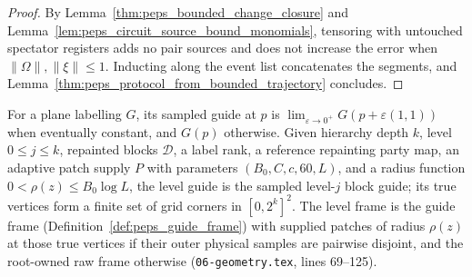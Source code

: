 \begin{proof}\leanok
    By Lemma~\ref{thm:peps_bounded_change_closure} and Lemma~\ref{lem:peps_circuit_source_bound_monomials}, tensoring with untouched spectator registers adds no pair sources and does not increase the error when $\lVert\Omega\rVert,\lVert\xi\rVert\le1$. Inducting along the event list concatenates the segments, and Lemma~\ref{thm:peps_protocol_from_bounded_trajectory} concludes.
\end{proof}

\begin{definition}
    \label{def:peps_protocol_level_frame}
    \leanok
    For a plane labelling $G$, its sampled guide at $p$ is $\lim_{\varepsilon\to0^+}G(p+\varepsilon(1,1))$ when eventually constant, and $G(p)$ otherwise. Given hierarchy depth $k$, level $0\le j\le k$, repainted blocks $\mathcal D$, a label rank, a reference repainting party map, an adaptive patch supply $P$ with parameters $(B_0,C,c,60,L)$, and a radius function $0<\rho(z)\le B_0\log L$, the level guide is the sampled level-$j$ block guide; its true vertices form a finite set of grid corners in $[0,2^k]^2$. The level frame is the guide frame (Definition~\ref{def:peps_guide_frame}) with supplied patches of radius $\rho(z)$ at those true vertices if their outer physical samples are pairwise disjoint, and the root-owned raw frame otherwise (\texttt{06-geometry.tex}, lines 69--125).
\end{definition}

